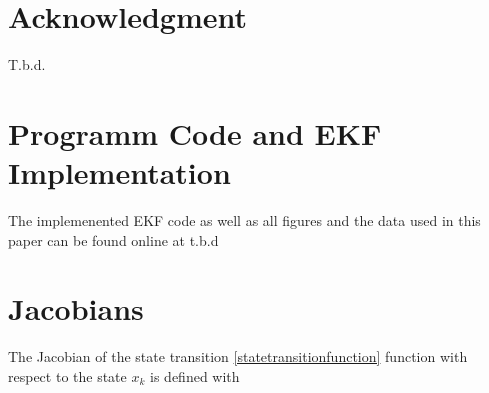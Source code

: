 \documentclass[conference]{IEEEtran}
\begin{document}

%

\section*{Acknowledgment}

T.b.d.

\appendices
\section{Programm Code and EKF Implementation}
The implemenented EKF code as well as all figures and the data used in this paper can be found online at t.b.d %

\section{Jacobians}

The Jacobian of the state transition \eqref{statetransitionfunction} function with respect to the state $x_k$ is defined with
\end{document}
